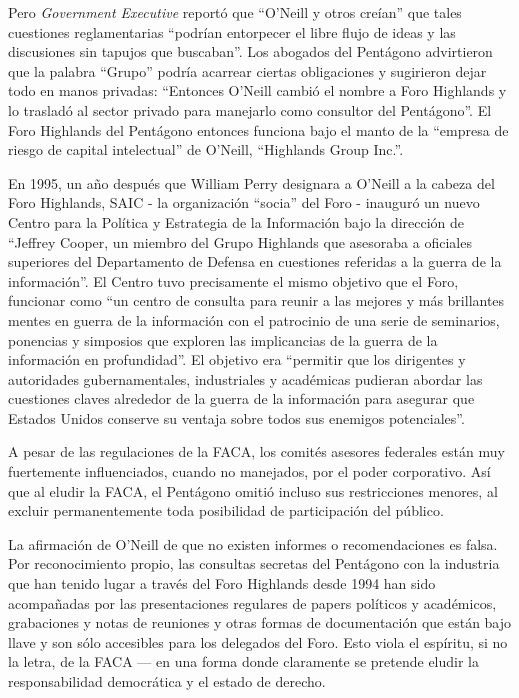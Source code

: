 \documentclass[10pt,a5paper,twoside,spanish,]{book}
\begin{document}
Pero \emph{Government Executive} reportó que ``O'Neill y otros creían''
que tales cuestiones reglamentarias ``podrían entorpecer el libre flujo
de ideas y las discusiones sin tapujos que buscaban''. Los abogados del
Pentágono advirtieron que la palabra ``Grupo'' podría acarrear ciertas
obligaciones y sugirieron dejar todo en manos privadas: ``Entonces
O'Neill cambió el nombre a Foro Highlands y lo trasladó al sector
privado para manejarlo como consultor del Pentágono''. El Foro Highlands
del Pentágono entonces funciona bajo el manto de la ``empresa de riesgo
de capital intelectual'' de O'Neill, ``Highlands Group Inc.''.

En 1995, un año después que William Perry designara a O'Neill a la
cabeza del Foro Highlands, SAIC - la organización ``socia'' del Foro -
inauguró un nuevo Centro para la Política y Estrategia de la Información
bajo la dirección de ``Jeffrey Cooper, un miembro del Grupo Highlands
que asesoraba a oficiales superiores del Departamento de Defensa en
cuestiones referidas a la guerra de la información''. El Centro tuvo
precisamente el mismo objetivo que el Foro, funcionar como ``un centro
de consulta para reunir a las mejores y más brillantes mentes en guerra
de la información con el patrocinio de una serie de seminarios,
ponencias y simposios que exploren las implicancias de la guerra de la
información en profundidad''. El objetivo era ``permitir que los
dirigentes y autoridades gubernamentales, industriales y académicas
pudieran abordar las cuestiones claves alrededor de la guerra de la
información para asegurar que Estados Unidos conserve su ventaja sobre
todos sus enemigos potenciales''.

A pesar de las regulaciones de la FACA, los comités asesores federales
están muy fuertemente influenciados, cuando no manejados, por el poder
corporativo. Así que al eludir la FACA, el Pentágono omitió incluso sus
restricciones menores, al excluir permanentemente toda posibilidad de
participación del público.

La afirmación de O'Neill de que no existen informes o recomendaciones es
falsa. Por reconocimiento propio, las consultas secretas del Pentágono
con la industria que han tenido lugar a través del Foro Highlands desde
1994 han sido acompañadas por las presentaciones regulares de papers
políticos y académicos, grabaciones y notas de reuniones y otras formas
de documentación que están bajo llave y son sólo accesibles para los
delegados del Foro. Esto viola el espíritu, si no la letra, de la FACA
--- en una forma donde claramente se pretende eludir la responsabilidad
democrática y el estado de derecho.
\end{document}

